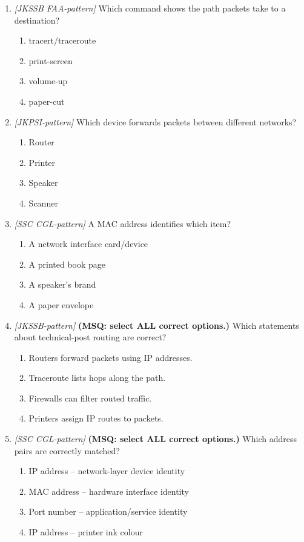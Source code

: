 \documentclass[11pt]{article}
\begin{document}
\begin{enumerate}[label=\textbf{Q\arabic*.}, leftmargin=*]
\item \textit{[JKSSB FAA-pattern]} Which command shows the path packets take to a destination?
  \begin{enumerate}[label=\Alph*.]
    \item tracert/traceroute
    \item print-screen
    \item volume-up
    \item paper-cut
  \end{enumerate}
\item \textit{[JKPSI-pattern]} Which device forwards packets between different networks?
  \begin{enumerate}[label=\Alph*.]
    \item Router
    \item Printer
    \item Speaker
    \item Scanner
  \end{enumerate}
\item \textit{[SSC CGL-pattern]} A MAC address identifies which item?
  \begin{enumerate}[label=\Alph*.]
    \item A network interface card/device
    \item A printed book page
    \item A speaker's brand
    \item A paper envelope
  \end{enumerate}
\item \textit{[JKSSB-pattern]} \textbf{(MSQ: select ALL correct options.)} Which statements about technical-post routing are correct?
  \begin{enumerate}[label=\Alph*.]
    \item Routers forward packets using IP addresses.
    \item Traceroute lists hops along the path.
    \item Firewalls can filter routed traffic.
    \item Printers assign IP routes to packets.
  \end{enumerate}
\item \textit{[SSC CGL-pattern]} \textbf{(MSQ: select ALL correct options.)} Which address pairs are correctly matched?
  \begin{enumerate}[label=\Alph*.]
    \item IP address -- network-layer device identity
    \item MAC address -- hardware interface identity
    \item Port number -- application/service identity
    \item IP address -- printer ink colour
  \end{enumerate}
\end{enumerate}
\def\JKSSBLessonID{66}\def\JKSSBAnswers{0}
\end{document}

